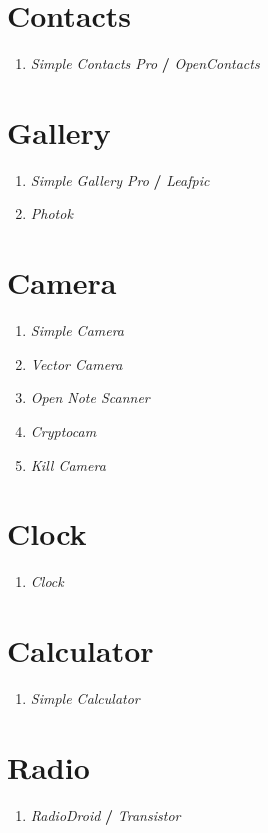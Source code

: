 \documentclass[12pt , a4paper]{article}
\begin{document}
\section{Contacts}
\begin{enumerate}
	\item[] \emph{Simple Contacts Pro} \textbf{/} \emph{OpenContacts}
\end{enumerate}

\section{Gallery}
\begin{enumerate}
	\item \emph{Simple Gallery Pro} \textbf{/} \emph{Leafpic}
	\item \emph{Photok}
\end{enumerate}

\section{Camera}
\begin{enumerate}
	\item \emph{Simple Camera}
	\item \emph{Vector Camera}
	\item \emph{Open Note Scanner}
	\item \emph{Cryptocam}
	\item \emph{Kill Camera}
\end{enumerate}

\section{Clock}
\begin{enumerate}
	\item[] \emph{Clock}
\end{enumerate}

\section{Calculator}
\begin{enumerate}
	\item[] \emph{Simple Calculator}
\end{enumerate}

\section{Radio}
\begin{enumerate}
	\item[] \emph{RadioDroid } \textbf{/} \emph{Transistor}
\end{enumerate}
\end{document}
